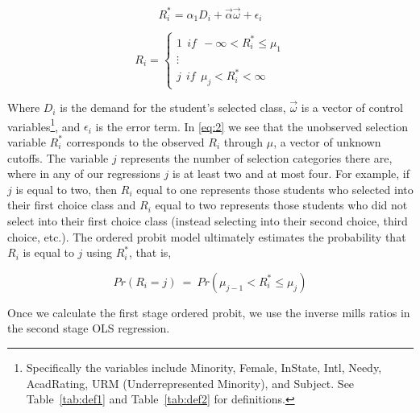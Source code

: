 \documentclass[12pt,a4paper,english,fleqn]{article}
\newcommand{\tablelabel}[1]{Table~\ref{#1}}
\begin{document}
\setlength{\belowdisplayskip}{1pt} \setlength{\belowdisplayshortskip}{1pt}
\setlength{\abovedisplayskip}{1pt} \setlength{\abovedisplayshortskip}{1pt}

\begin{equation}\label{eq:1}
R_{i}^{*} = \alpha_{1} D_{i} + \overrightarrow{\alpha} \overrightarrow{\omega} + \epsilon_{i}
\end{equation}

\begin{equation}\label{eq:2}
R_{i} = 
\begin{cases}
  1 \ \ if \ \ - \infty < R_{i}^{*} \leq \mu_{1} \\
  \vdots \\
  j \ \ if \ \ \mu_{j} < R_{i}^{*} < \infty
\end{cases}
\end{equation}

Where $D_{i}$ is the demand for the student's selected class, $\overrightarrow{\omega}$ is a vector of control variables\footnote{Specifically the variables include Minority, Female, InState, Intl, Needy, AcadRating, URM (Underrepresented Minority), and Subject. See \tablelabel{tab:def1} and \tablelabel{tab:def2} for definitions.}, and $\epsilon_{i}$ is the error term. 
In \eqref{eq:2} we see that the unobserved selection variable $R_{i}^{*}$ corresponds to the observed $R_{i}$ through $\mu$, a vector of unknown cutoffs. 
The variable $j$ represents the number of selection categories there are, where in any of our regressions $j$ is at least two and at most four. 
For example, if $j$ is equal to two, then $R_{i}$ equal to one represents those students who selected into their first choice class and $R_{i}$ equal to two represents those students who did not select into their first choice class (instead selecting into their second choice, third choice, etc.). 
The ordered probit model ultimately estimates the probability that $R_{i}$ is equal to $j$ using $R_{i}^{*}$, that is, 

\setlength{\belowdisplayskip}{5pt} \setlength{\belowdisplayshortskip}{1pt}
\setlength{\abovedisplayskip}{-4pt} \setlength{\abovedisplayshortskip}{1pt}

\begin{equation}\label{eq:3}
Pr(R_{i} = j) \ = \ Pr(\mu_{j-1} < R_{i}^{*} \leq \mu_{j})
\end{equation}

\noindent Once we calculate the first stage ordered probit, we use the inverse mills ratios in the second stage OLS regression.
\end{document}
